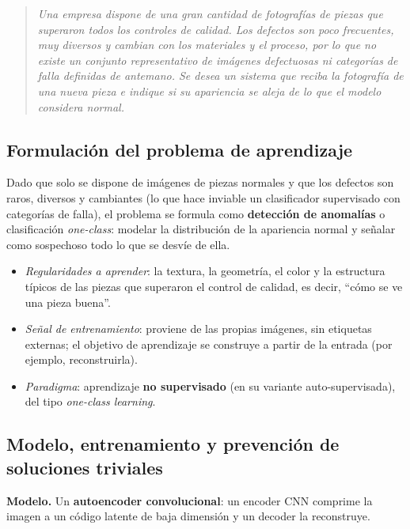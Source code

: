 \documentclass[12pt, a4paper]{article}
\newenvironment{enunciado}
  {\begin{quote}\itshape\color{black!75}}
  {\end{quote}}
\begin{document}
\begin{enunciado}
Una empresa dispone de una gran cantidad de fotografías de piezas que superaron todos los
controles de calidad. Los defectos son poco frecuentes, muy diversos y cambian con los
materiales y el proceso, por lo que no existe un conjunto representativo de imágenes
defectuosas ni categorías de falla definidas de antemano. Se desea un sistema que reciba la
fotografía de una nueva pieza e indique si su apariencia se aleja de lo que el modelo
considera normal.
\end{enunciado}

\subsection{Formulación del problema de aprendizaje}

Dado que solo se dispone de imágenes de piezas normales y que los defectos son raros,
diversos y cambiantes (lo que hace inviable un clasificador supervisado con categorías de
falla), el problema se formula como \textbf{detección de anomalías} o clasificación
\emph{one-class}: modelar la distribución de la apariencia normal y señalar como sospechoso
todo lo que se desvíe de ella.

\begin{itemize}[leftmargin=2em]
  \item \emph{Regularidades a aprender}: la textura, la geometría, el color y la estructura
        típicos de las piezas que superaron el control de calidad, es decir, ``cómo se ve
        una pieza buena''.
  \item \emph{Señal de entrenamiento}: proviene de las propias imágenes, sin etiquetas
        externas; el objetivo de aprendizaje se construye a partir de la entrada (por
        ejemplo, reconstruirla).
  \item \emph{Paradigma}: aprendizaje \textbf{no supervisado} (en su variante
        auto-supervisada), del tipo \emph{one-class learning}.
\end{itemize}

\subsection{Modelo, entrenamiento y prevención de soluciones triviales}

\textbf{Modelo.} Un \textbf{autoencoder convolucional}: un encoder CNN comprime la imagen a
un código latente de baja dimensión y un decoder la reconstruye.
\end{document}
